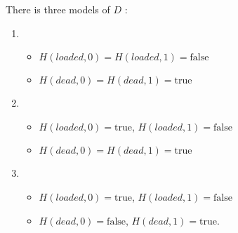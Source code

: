 There is three models of $D$ :
\begin{enumerate}
  \item \begin{itemize}
    \item $H(loaded,0)=H(loaded,1)=\text{false}$
    \item $H(dead,0)=H(dead,1)=\text{true}$
  \end{itemize}
  \item \begin{itemize}
    \item $H(loaded,0)=\text{true}$, $H(loaded,1)=\text{false}$
    \item $H(dead,0)=H(dead,1)=\text{true}$
  \end{itemize}
  \item \begin{itemize}
    \item $H(loaded,0)=\text{true}$, $H(loaded,1)=\text{false}$
    \item $H(dead,0)=\text{false}$, $H(dead,1)=\text{true}$.
  \end{itemize}
\end{enumerate}

